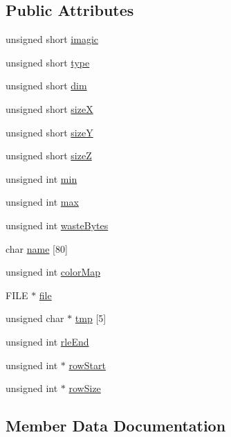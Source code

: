 \subsection*{Public Attributes}
\begin{DoxyCompactItemize}
\item 
unsigned short \hyperlink{structImage_af799972ef29d6e5f544756ba66f3b6e8}{imagic}
\item 
unsigned short \hyperlink{structImage_a1a32131c2efbb278f0e5f0b554e171b1}{type}
\item 
unsigned short \hyperlink{structImage_a12d84a1935987c4d962564d8419f5eee}{dim}
\item 
unsigned short \hyperlink{structImage_a319a8271c4203b26369f30eca377d4a2}{size\+X}
\item 
unsigned short \hyperlink{structImage_a2559c006462a068477c483c7dbe7cec4}{size\+Y}
\item 
unsigned short \hyperlink{structImage_a260dcb02ec4f3f489245f8d9eb6b4b5f}{size\+Z}
\item 
unsigned int \hyperlink{structImage_a13840d23038045ddd3ced87fc1743eee}{min}
\item 
unsigned int \hyperlink{structImage_ab432fd4170d7b4881d56ec2e0659c033}{max}
\item 
unsigned int \hyperlink{structImage_a767d0814412c848df245e3fd6f4bcc11}{waste\+Bytes}
\item 
char \hyperlink{structImage_a36e3bcd556a3c663614a96c3a7286e11}{name} \mbox{[}80\mbox{]}
\item 
unsigned int \hyperlink{structImage_a6f320ae48d9a3bca2e7f5a6fa501f521}{color\+Map}
\item 
F\+I\+L\+E $\ast$ \hyperlink{structImage_ad4668f1504e7d068753c89cb813d2733}{file}
\item 
unsigned char $\ast$ \hyperlink{structImage_a9baf3bb52b5842bf2ff76ece5a5339a5}{tmp} \mbox{[}5\mbox{]}
\item 
unsigned int \hyperlink{structImage_a5cd308b399153ab7cff993f9fbfa3147}{rle\+End}
\item 
unsigned int $\ast$ \hyperlink{structImage_a8447c2ad0f3d00646c44743bbe7a8b5f}{row\+Start}
\item 
unsigned int $\ast$ \hyperlink{structImage_abf03695b90e13af7e01e9c7ec347d7e0}{row\+Size}
\end{DoxyCompactItemize}


\subsection{Member Data Documentation}
\hypertarget{structImage_a6f320ae48d9a3bca2e7f5a6fa501f521}{}
